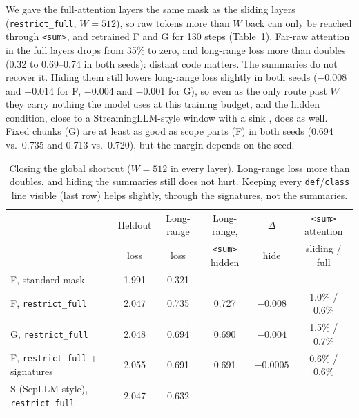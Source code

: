 \documentclass[10pt,twocolumn]{article}
\makeatletter
\renewcommand{\paragraph}{\@startsection{paragraph}{4}{\z@}{6pt}{-0.6em}{\normalfont\normalsize\bfseries}}
\newcommand{\sumtok}{\texttt{<sum>}}
\makeatother
\begin{document}
\paragraph{Closing the shortcut.}
We gave the full-attention layers the same mask as the sliding layers
(\texttt{restrict\_full}, $W=512$), so raw tokens more than $W$ back can
only be reached through \sumtok{}, and retrained F and G for 130 steps
(Table~\ref{tab:rf}). Far-raw attention in the full layers drops from 35\%
to zero, and long-range loss more than doubles (0.32 to 0.69--0.74 in both
seeds): distant code matters. The summaries do not recover it. Hiding them
still lowers long-range loss slightly in both seeds ($-0.008$ and $-0.014$
for F, $-0.004$ and $-0.001$ for G), so even as the only route past $W$ they
carry nothing the model uses at this training budget, and the hidden
condition, close to a StreamingLLM-style window with a sink
\citep{xiao2023sinks}, does as well. Fixed chunks (G) are at least as good as
scope parts (F) in both seeds (0.694 vs.\ 0.735 and 0.713 vs.\ 0.720), but
the margin depends on the seed.

\begin{table}[t]
\centering
\caption{Closing the global shortcut ($W=512$ in every layer). Long-range loss
more than doubles, and hiding the summaries still does not hurt. Keeping every
\texttt{def}/\texttt{class} line visible (last row) helps slightly, through the
signatures, not the summaries.}\small
\begin{tabular}{@{}lccccc@{}}
\toprule
& Heldout & Long-range & Long-range, & $\Delta$ & \sumtok{} attention \\
& loss & loss & \sumtok{} hidden & hide & sliding / full \\
\midrule
F, standard mask & 1.991 & 0.321 & -- & -- & -- \\
F, \texttt{restrict\_full} & 2.047 & 0.735 & 0.727 & $-0.008$ & 1.0\% / 0.6\% \\
G, \texttt{restrict\_full} & 2.048 & 0.694 & 0.690 & $-0.004$ & 1.5\% / 0.7\% \\
F, \texttt{restrict\_full} + signatures & 2.055 & 0.691 & 0.691 & $-0.0005$ & 0.6\% / 0.6\% \\
S (SepLLM-style), \texttt{restrict\_full} & 2.047 & 0.632 & -- & -- & -- \\
\bottomrule
\end{tabular}

\label{tab:rf}
\end{table}
\end{document}
